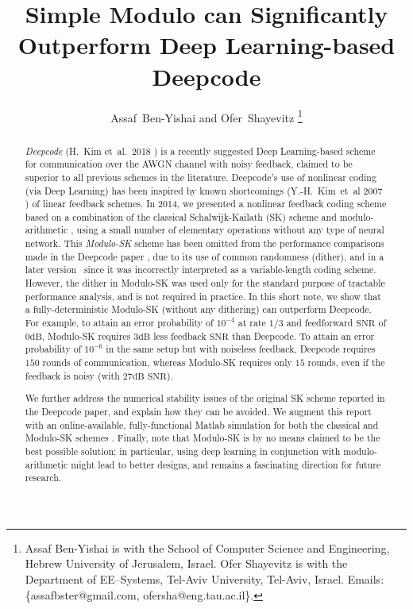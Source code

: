 \documentclass[article,onecolumn,11pt]{IEEEtran}
\newcommand{\dB}{\mathrm{dB}}
\newcommand{\snr}{\mathrm{SNR}}
\begin{document}
\title{Simple Modulo can {Significantly} Outperform Deep Learning-based Deepcode}


\author{Assaf~Ben-Yishai and Ofer~Shayevitz
\thanks{
Assaf Ben-Yishai is with the School of Computer Science and Engineering, Hebrew University of Jerusalem, Israel. 
Ofer Shayevitz is with the Department of EE--Systems, Tel-Aviv University, Tel-Aviv, Israel. Emails: \{assafbster@gmail.com, ofersha@eng.tau.ac.il\}.}}

\date{}
\maketitle
\begin{abstract}
\textit{Deepcode} (H.~Kim et~al.~2018 \cite{kim2018deepcode}) is a recently suggested Deep Learning-based scheme for communication over the AWGN channel with noisy feedback, claimed to be superior to all previous schemes in the literature. Deepcode's use of nonlinear coding (via Deep Learning) has been inspired by known shortcomings (Y.-H.~Kim~et~al 2007 \cite{Kim2007}) of linear feedback schemes. In  2014, we presented a nonlinear feedback coding scheme based on a combination of the classical Schalwijk-Kailath (SK) scheme and modulo-arithmetic \cite{SimpleInteractionAllerton2014}, using a small number of elementary operations without any type of neural network. This \textit{Modulo-SK} scheme has been omitted from the performance comparisons made in the Deepcode paper \cite{kim2018deepcode}, due to its use of common randomness (dither), and in a later version~\cite{DeepcodeIEEE} since it was incorrectly interpreted as a variable-length coding scheme. However, the dither in Modulo-SK was used only for the standard purpose of tractable performance analysis, and is not required in practice. In this short note, we show that a fully-deterministic Modulo-SK (without any dithering) can outperform Deepcode. For example, to attain an error probability of $10^{-4}$ at rate $1/3$ and feedforward $\snr$ of $0\dB$, Modulo-SK requires $3\dB$ less feedback $\snr$ than Deepcode. To attain an error probability of $10^{-6}$ in the same setup but with noiseless feedback, Deepcode requires $150$ rounds of communication, whereas Modulo-SK requires only $15$ rounds, even if the feedback is noisy (with $27\dB$ $\snr$). 

We further address the numerical stability issues of the original SK scheme reported in the Deepcode paper, and explain how they can be avoided. We augment this report with an online-available, fully-functional Matlab simulation for both the classical and Modulo-SK schemes \cite{ModuloSKcode}. Finally, note that Modulo-SK is by no means claimed to be the best possible solution; in particular, using deep learning in conjunction with modulo-arithmetic might lead to better designs, and remains a fascinating direction for future research. 
\end{abstract}
\nocite{DeepcodeNIPS}
\end{document}
